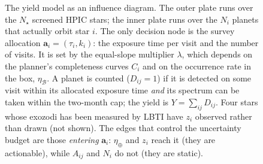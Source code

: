 \documentclass[11pt,a4paper]{article}
\begin{document}
\begin{figure}[p]
\vspace{0.6em}
\caption{The yield model as an influence diagram. The outer plate runs over the $N_\star$
screened HPIC stars; the inner plate runs over the $N_i$ planets that actually orbit star $i$. The
only decision node is the survey allocation $\mathbf{a}_i = (\tau_i, k_i)$: the exposure time per
visit and the number of visits. It is set by the equal-slope multiplier $\lambda$, which depends on
the planner's completeness curves $C_i$ and on the occurrence rate in the box,
$\eta_{\mathcal{B}}$. A planet is counted ($D_{ij} = 1$) if it is detected on some visit within
its allocated exposure time \emph{and} its spectrum can be taken within the two-month cap; the
yield is $Y = \sum_{ij} D_{ij}$. Four stars whose exozodi has been measured by LBTI have $z_i$
observed rather than drawn (not shown). The edges that control the uncertainty budget are those
\emph{entering} $\mathbf{a}_i$: $\eta_\oplus$ and $z_i$ reach it (they are actionable), while
$A_{ij}$ and $N_i$ do not (they are static).}
\label{fig:pgm}
\end{figure}
\end{document}
